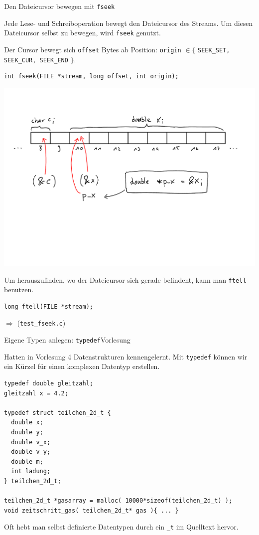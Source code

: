 \documentclass[xcolor=dvipsnames]{beamer}
\newcounter{lecturecounter}
\begin{document}
\begin{frame}[fragile]{Den Dateicursor bewegen mit \texttt{fseek}}
\begin{block}{}
  Jede Lese- und Schreiboperation bewegt den Dateicursor des Streams. Um diesen Dateicursor selbst zu bewegen, wird \verb|fseek| genutzt. 
  
  Der Cursor bewegt sich \texttt{offset} Bytes ab Position: \texttt{origin} $\in \lbrace$ \verb|SEEK_SET, SEEK_CUR, SEEK_END| $\rbrace$.
\end{block}
\begin{lstlisting}
int fseek(FILE *stream, long offset, int origin);
\end{lstlisting}
\includegraphics[width=\textwidth,page=5,trim=0 13cm 0 2cm,clip=true]{graphics/c_kurs_tafel}
\begin{block}{}
  Um herauszufinden, wo der Dateicursor sich gerade befindent, kann man \verb|ftell| benutzen.
\end{block}
\begin{lstlisting}
long ftell(FILE *stream);
\end{lstlisting}
$\Rightarrow$ (\verb|test_fseek.c|)
\end{frame}


\begin{frame}[fragile]{Eigene Typen anlegen: \texttt{typedef}}{Vorlesung }
\begin{block}{}
  Hatten in Vorlesung 4 Datenstrukturen kennengelernt. Mit \texttt{typedef} können wir ein Kürzel für einen komplexen Datentyp erstellen.
\end{block}
\begin{lstlisting}
typedef double gleitzahl;
gleitzahl x = 4.2;

typedef struct teilchen_2d_t {
  double x;
  double y;
  double v_x;
  double v_y;
  double m;
  int ladung;
} teilchen_2d_t;

teilchen_2d_t *gasarray = malloc( 10000*sizeof(teilchen_2d_t) );
void zeitschritt_gas( teilchen_2d_t* gas ){ ... }
\end{lstlisting}
\begin{block}{}
  Oft hebt man selbst definierte Datentypen durch ein \texttt{\_t} im Quelltext hervor.
\end{block}
\end{frame}
\end{document}
